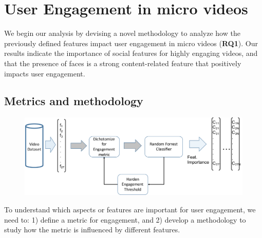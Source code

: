 \section{User Engagement in micro videos}
\label{sec:classifier}
We begin our analysis by devising a novel 
methodology to analyze how the previously defined features impact user engagement in micro videos (\textbf{RQ1}). Our results indicate the importance of social features for highly engaging videos, and that the presence of faces is a strong content-related feature that positively impacts user engagement.

\subsection{Metrics and methodology}
\label{sec:methodology}

\begin{figure}[htp]
    \centering
        \includegraphics[width=\textwidth]{pipeline.pdf}       
        \label{fig:pipeline}
\end{figure}


To understand which aspects or features are important for user engagement, we need to: 1) define a metric for engagement, and 2) develop a methodology to study how the metric is influenced by different features. 

